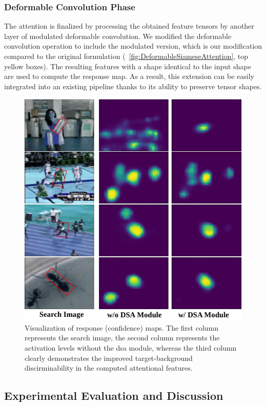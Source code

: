 \subsubsection{Deformable Convolution Phase}

The attention is finalized by processing the obtained feature tensors by another layer of modulated deformable convolution. We modified the deformable convolution operation to include the modulated version, which is our modification compared to the original formulation (\figtext{}~\ref{fig:DeformableSiameseAttention}, top yellow boxes). The resulting features with a shape identical to the input shape are used to compute the response map. As a result, this extension can be easily integrated into an existing pipeline thanks to its ability to preserve tensor shapes.

\begin{figure}[t]
  \centerline{\includegraphics[width=0.5\linewidth]{figures/siamese_tracking/dsa_attention_visualization.pdf}}
  \caption[\gls{dsa} attention visualization]{Visualization of response (confidence) maps. The first column represents the search image, the second column represents the activation levels without the \gls{dsa} module, whereas the third column clearly demonstrates the improved target-background discirminability in the computed attentional features. }
  \label{fig:DSAAttentionVisualization}
\end{figure}

\subsection{Experimental Evaluation and Discussion}
\label{ssec:DSAExperimentalEvaluation}

